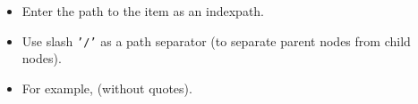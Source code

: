 \begin{itemize}
\item Enter the path to the item as an indexpath.
\item Use slash {\tt '/'} as a path separator (to separate parent nodes from child nodes).
\item For example,  (without quotes). 

  \end{itemize}
